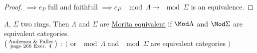 \begin{prop}
\begin{proof}
$\implies e_P$ full and faithfull $\implies e_P: \mod\Lambda \to \mod\Sigma$ is an equivalence.
\end{proof}
\end{prop}

\begin{defin}
$\Lambda$, $\Sigma$ two rings. Then $\Lambda$ and $\Sigma$ are \underline{Morita equivalent} if $\Mod\Lambda$ and $\Mod\Sigma$ are equivalent categories.\\
$\begin{psmallmatrix} \text{Anderson \& Fuller}\\ \text{page 266 Exer. 4} \end{psmallmatrix}$ : $($ or $\mod\Lambda$ and $\mod\Sigma$ are equivalent categories $)$
\end{defin}



